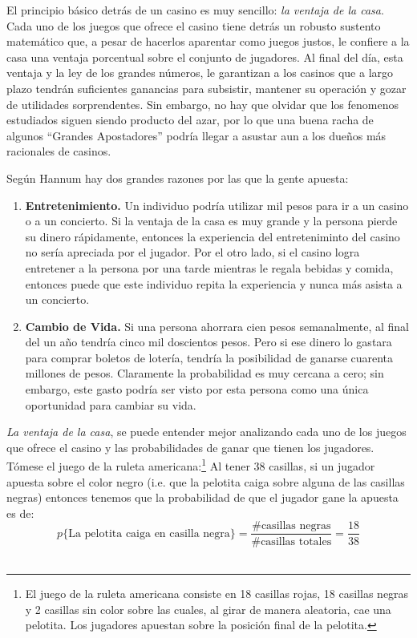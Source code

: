 El principio básico detrás de un casino es muy sencillo: \emph{la ventaja de la casa}. Cada uno de los juegos que ofrece el casino tiene detrás un robusto sustento matemático que, a pesar de hacerlos aparentar como juegos justos, le confiere a la casa una ventaja porcentual sobre el conjunto de jugadores. Al final del día, esta ventaja y la ley de los grandes números, le garantizan a los casinos que a largo plazo tendrán suficientes ganancias para subsistir, mantener su operación y gozar de utilidades sorprendentes. Sin embargo, no hay que olvidar que los fenomenos estudiados siguen siendo producto del azar, por lo que una buena racha de algunos ``Grandes Apostadores'' podría llegar a asustar aun a los dueños  más racionales de casinos\cite{hannum2005practical}.


Según Hannum\cite{hannum2005practical} hay dos grandes razones por las que la gente apuesta:

\begin{enumerate}
	\item \textbf{Entretenimiento.} Un individuo podría utilizar mil pesos para ir a un casino o a un concierto. Si la ventaja de la casa es muy grande y la persona pierde su dinero rápidamente, entonces la experiencia del entreteniminto del casino no sería apreciada por el jugador. Por el otro lado, si el casino logra entretener a la persona por una tarde mientras le regala bebidas y comida, entonces puede que este individuo repita la experiencia y nunca más asista a un concierto.
	\item \textbf{Cambio de Vida.} Si una persona ahorrara cien pesos semanalmente, al final del un año tendría cinco mil doscientos pesos. Pero si ese dinero lo gastara para comprar boletos de lotería, tendría la posibilidad de ganarse cuarenta millones de pesos. Claramente la probabilidad es muy cercana a cero; sin embargo, este gasto podría ser visto por esta persona como una única oportunidad para cambiar su vida.

\end{enumerate}

\emph{La ventaja de la casa}, se puede entender mejor analizando cada uno de los juegos que ofrece el casino y las probabilidades de ganar que tienen los jugadores. Tómese el juego de la ruleta americana:\footnote{El juego de la ruleta americana consiste en 18 casillas rojas, 18 casillas negras y 2 casillas sin color sobre las cuales, al girar de manera aleatoria, cae una pelotita. Los jugadores apuestan sobre la posición final de la pelotita.}
Al tener $38$ casillas, si un jugador apuesta sobre el color negro (i.e. que la pelotita caiga sobre alguna de las casillas negras) entonces tenemos que la probabilidad de que el jugador gane la apuesta es de:\\
\[p\{\text{La pelotita caiga en casilla negra}\} = \frac{\text{\# casillas negras}}{ \text{\# casillas totales}}  = \frac{18}{38}\]\\

